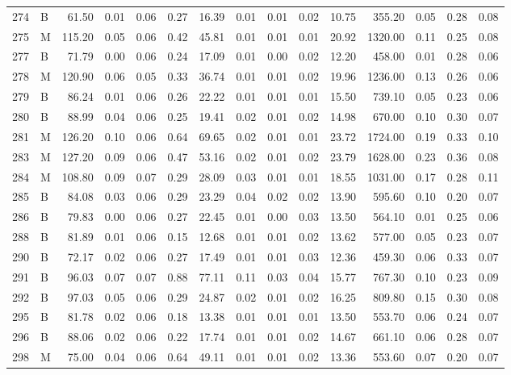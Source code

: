 \begin{table}[ht]
\begin{tabular}{rlrrrrrrrrrrrrr}
  274 & B & 61.50 & 0.01 & 0.06 & 0.27 & 16.39 & 0.01 & 0.01 & 0.02 & 10.75 & 355.20 & 0.05 & 0.28 & 0.08 \\ 
  275 & M & 115.20 & 0.05 & 0.06 & 0.42 & 45.81 & 0.01 & 0.01 & 0.01 & 20.92 & 1320.00 & 0.11 & 0.25 & 0.08 \\ 
  277 & B & 71.79 & 0.00 & 0.06 & 0.24 & 17.09 & 0.01 & 0.00 & 0.02 & 12.20 & 458.00 & 0.01 & 0.28 & 0.06 \\ 
  278 & M & 120.90 & 0.06 & 0.05 & 0.33 & 36.74 & 0.01 & 0.01 & 0.02 & 19.96 & 1236.00 & 0.13 & 0.26 & 0.06 \\ 
  279 & B & 86.24 & 0.01 & 0.06 & 0.26 & 22.22 & 0.01 & 0.01 & 0.01 & 15.50 & 739.10 & 0.05 & 0.23 & 0.06 \\ 
  280 & B & 88.99 & 0.04 & 0.06 & 0.25 & 19.41 & 0.02 & 0.01 & 0.02 & 14.98 & 670.00 & 0.10 & 0.30 & 0.07 \\ 
  281 & M & 126.20 & 0.10 & 0.06 & 0.64 & 69.65 & 0.02 & 0.01 & 0.01 & 23.72 & 1724.00 & 0.19 & 0.33 & 0.10 \\ 
  283 & M & 127.20 & 0.09 & 0.06 & 0.47 & 53.16 & 0.02 & 0.01 & 0.02 & 23.79 & 1628.00 & 0.23 & 0.36 & 0.08 \\ 
  284 & M & 108.80 & 0.09 & 0.07 & 0.29 & 28.09 & 0.03 & 0.01 & 0.01 & 18.55 & 1031.00 & 0.17 & 0.28 & 0.11 \\ 
  285 & B & 84.08 & 0.03 & 0.06 & 0.29 & 23.29 & 0.04 & 0.02 & 0.02 & 13.90 & 595.60 & 0.10 & 0.20 & 0.07 \\ 
  286 & B & 79.83 & 0.00 & 0.06 & 0.27 & 22.45 & 0.01 & 0.00 & 0.03 & 13.50 & 564.10 & 0.01 & 0.25 & 0.06 \\ 
  288 & B & 81.89 & 0.01 & 0.06 & 0.15 & 12.68 & 0.01 & 0.01 & 0.02 & 13.62 & 577.00 & 0.05 & 0.23 & 0.07 \\ 
  290 & B & 72.17 & 0.02 & 0.06 & 0.27 & 17.49 & 0.01 & 0.01 & 0.03 & 12.36 & 459.30 & 0.06 & 0.33 & 0.07 \\ 
  291 & B & 96.03 & 0.07 & 0.07 & 0.88 & 77.11 & 0.11 & 0.03 & 0.04 & 15.77 & 767.30 & 0.10 & 0.23 & 0.09 \\ 
  292 & B & 97.03 & 0.05 & 0.06 & 0.29 & 24.87 & 0.02 & 0.01 & 0.02 & 16.25 & 809.80 & 0.15 & 0.30 & 0.08 \\ 
  295 & B & 81.78 & 0.02 & 0.06 & 0.18 & 13.38 & 0.01 & 0.01 & 0.01 & 13.50 & 553.70 & 0.06 & 0.24 & 0.07 \\ 
  296 & B & 88.06 & 0.02 & 0.06 & 0.22 & 17.74 & 0.01 & 0.01 & 0.02 & 14.67 & 661.10 & 0.06 & 0.28 & 0.07 \\ 
  298 & M & 75.00 & 0.04 & 0.06 & 0.64 & 49.11 & 0.01 & 0.01 & 0.02 & 13.36 & 553.60 & 0.07 & 0.20 & 0.07 \\ 

\end{tabular}
\end{table}
